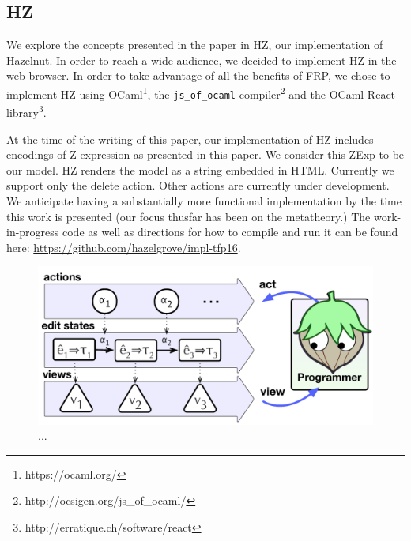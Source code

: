 \subsection{HZ}
We explore the concepts presented in the paper in HZ, our implementation of Hazelnut.
In order to reach a wide audience, we decided to implement HZ in the web browser.
In order to take advantage of all the benefits of FRP, we chose to implement HZ using OCaml\footnote{https://ocaml.org/}, the \texttt{js\_of\_ocaml} compiler\footnote{http://ocsigen.org/js\_of\_ocaml/} and the OCaml React library\footnote{http://erratique.ch/software/react}.

At the time of the writing of this paper, our implementation of HZ includes encodings of Z-expression as presented in this paper.
We consider this ZExp to be our model. 
HZ renders the model as a string embedded in HTML.
Currently we support only the delete action.  Other actions are currently under development. We anticipate having a substantially more functional implementation by the time this work is presented (our focus thusfar has been on the metatheory.) 
The work-in-progress code as well as directions for how to compile and run it can be found here: \url{https://github.com/hazelgrove/impl-tfp16}.

\begin{figure}
\centering
\includegraphics[width=0.90\columnwidth]{impl-overview2}
\caption{...}
\label{fig:impl-overview}
\end{figure}
